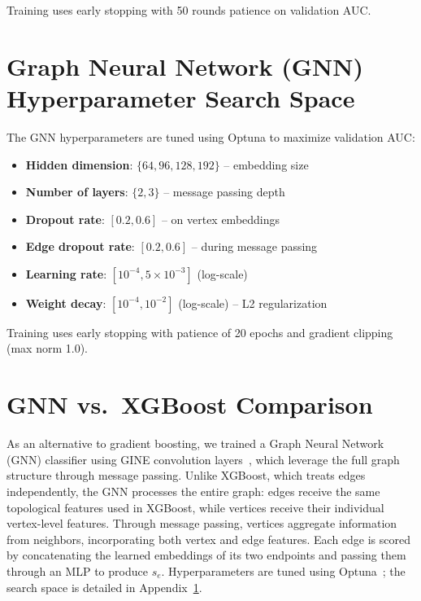 \documentclass{article}
\begin{document}
    Training uses early stopping with 50 rounds patience on validation AUC.

    \section{Graph Neural Network (GNN) Hyperparameter Search Space}
    \label{app:gnn-hyperparams}

    The GNN hyperparameters are tuned using Optuna to maximize validation AUC:

    \begin{itemize}
        \item \textbf{Hidden dimension}: $\{64, 96, 128, 192\}$ -- embedding size

        \item \textbf{Number of layers}: $\{2, 3\}$ -- message passing depth

        \item \textbf{Dropout rate}: $[0.2, 0.6]$ -- on vertex embeddings

        \item \textbf{Edge dropout rate}: $[0.2, 0.6]$ -- during message passing

        \item \textbf{Learning rate}: $[10^{-4}, 5 \times 10^{-3}]$ (log-scale)

        \item \textbf{Weight decay}: $[10^{-4}, 10^{-2}]$ (log-scale) -- L2 regularization
    \end{itemize}

    Training uses early stopping with patience of 20 epochs and gradient clipping (max norm 1.0).

    \section{GNN vs.~XGBoost Comparison}
    \label{app:gnn-xgb-comparison}

    As an alternative to gradient boosting, we trained a Graph Neural Network (GNN) classifier using GINE convolution layers~\citep{hu2019strategies}, which leverage the full graph structure through message passing. Unlike XGBoost, which treats edges independently, the GNN processes the entire graph: edges receive the same topological features used in XGBoost, while vertices receive their individual vertex-level features. Through message passing, vertices aggregate information from neighbors, incorporating both vertex and edge features. Each edge is scored by concatenating the learned embeddings of its two endpoints and passing them through an MLP to produce $s_{e}$. Hyperparameters are tuned using Optuna~\citep{optuna_2019}; the search space is detailed in Appendix~\ref{app:gnn-hyperparams}.
\end{document}
